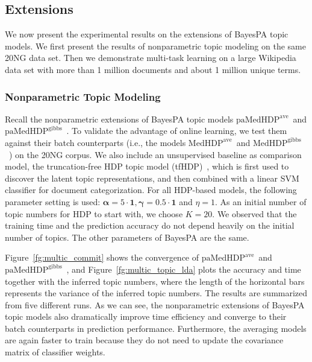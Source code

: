 \documentclass[twoside,11pt]{article}
\newcommand{\alphav}{\bm \alpha}
\newcommand{\gammav}{\bm \gamma}
\newcommand\paMedHDPave{$\text{paMedHDP}^{\text{ave}}$~}
\newcommand\paMedHDPgibbs{$\text{paMedHDP}^{\text{gibbs}}$~}
\newcommand\MedHDPave{$\text{MedHDP}^{\text{ave}}$~}
\newcommand\MedHDPgibbs{$\text{MedHDP}^{\text{gibbs}}$~}
\newcommand{\strin}[1]{\todo[size=\small, color=green!40]{\bf\sf  #1}}
\newcommand{\jun}[1]{\marginpar{\color{blue}\tiny{Jun: #1}}}
\begin{document}
\subsection{Extensions}

We now present the experimental results on the extensions of BayesPA topic models. We first present the results of nonparametric topic modeling on the same 20NG data set. Then we demonstrate multi-task learning on a large Wikipedia data set with more than 1 million documents and about 1 million unique terms.





\subsubsection{Nonparametric Topic Modeling}

Recall the nonparametric extensions of BayesPA topic models \paMedHDPave and \paMedHDPgibbs. To validate the advantage of online learning, we test them against their batch counterparts (i.e., the models \MedHDPave and \MedHDPgibbs) on the 20NG corpus. We also include an unsupervised baseline as comparison model, the truncation-free HDP topic model (tfHDP)~\citep{wang2012truncation}, which is first used to discover the latent topic representations, and then combined with a linear SVM classifier for document categorization. For all HDP-based models, the following parameter setting is used: $\alphav = 5 \cdot \bm{1}, \gammav = 0.5 \cdot \bm{1}$ and $\eta = 1$. As an initial number of topic numbers for HDP to start with, we choose $K = 20$. We observed that the training time and the prediction accuracy do not depend heavily on the initial number of topics. The other parameters of BayesPA are the same.


Figure~\ref{fg:multic_commit} shows the convergence of \paMedHDPave and \paMedHDPgibbs, and Figure~\ref{fg:multic_topic_lda} plots the accuracy and time together with the inferred topic numbers, where the length of the horizontal bars represents the variance of the inferred topic numbers. The results are summarized from five different runs. As we can see, the nonparametric extensions of BayesPA topic models also dramatically improve time efficiency and converge to their batch counterparts in prediction performance. Furthermore, the averaging models are again faster to train because they do not need to update the covariance matrix of classifier weights.
\end{document}
